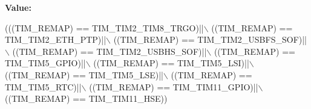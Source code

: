 {\bfseries Value\+:}
\begin{DoxyCode}
(((TIM\_REMAP) == TIM\_TIM2\_TIM8\_TRGO)||\(\backslash\)
                                  ((TIM\_REMAP) == TIM\_TIM2\_ETH\_PTP)||\(\backslash\)
                                  ((TIM\_REMAP) == TIM\_TIM2\_USBFS\_SOF)||\(\backslash\)
                                  ((TIM\_REMAP) == TIM\_TIM2\_USBHS\_SOF)||\(\backslash\)
                                  ((TIM\_REMAP) == TIM\_TIM5\_GPIO)||\(\backslash\)
                                  ((TIM\_REMAP) == TIM\_TIM5\_LSI)||\(\backslash\)
                                  ((TIM\_REMAP) == TIM\_TIM5\_LSE)||\(\backslash\)
                                  ((TIM\_REMAP) == TIM\_TIM5\_RTC)||\(\backslash\)
                                  ((TIM\_REMAP) == TIM\_TIM11\_GPIO)||\(\backslash\)
                                  ((TIM\_REMAP) == TIM\_TIM11\_HSE))
\end{DoxyCode}
